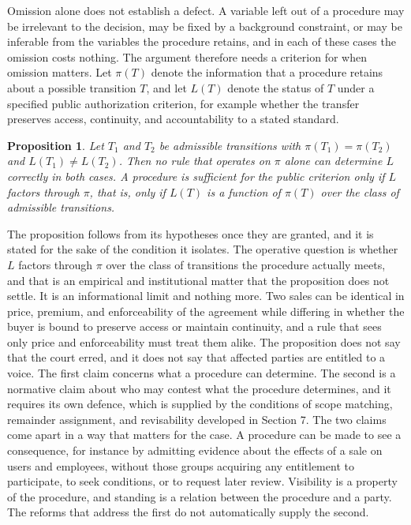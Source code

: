 \documentclass[11pt]{article}
\newtheorem{proposition}{Proposition}
\theoremstyle{definition}
\begin{document}
Omission alone does not establish a defect. A variable left out of a procedure may be irrelevant to the decision, may be fixed by a background constraint, or may be inferable from the variables the procedure retains, and in each of these cases the omission costs nothing. The argument therefore needs a criterion for when omission matters. Let $\pi(T)$ denote the information that a procedure retains about a possible transition $T$, and let $L(T)$ denote the status of $T$ under a specified public authorization criterion, for example whether the transfer preserves access, continuity, and accountability to a stated standard.

\begin{proposition}
Let $T_1$ and $T_2$ be admissible transitions with $\pi(T_1)=\pi(T_2)$ and $L(T_1)\neq L(T_2)$. Then no rule that operates on $\pi$ alone can determine $L$ correctly in both cases. A procedure is sufficient for the public criterion only if $L$ factors through $\pi$, that is, only if $L(T)$ is a function of $\pi(T)$ over the class of admissible transitions.
\end{proposition}

The proposition follows from its hypotheses once they are granted, and it is stated for the sake of the condition it isolates. The operative question is whether $L$ factors through $\pi$ over the class of transitions the procedure actually meets, and that is an empirical and institutional matter that the proposition does not settle. It is an informational limit and nothing more. Two sales can be identical in price, premium, and enforceability of the agreement while differing in whether the buyer is bound to preserve access or maintain continuity, and a rule that sees only price and enforceability must treat them alike. The proposition does not say that the court erred, and it does not say that affected parties are entitled to a voice. The first claim concerns what a procedure can determine. The second is a normative claim about who may contest what the procedure determines, and it requires its own defence, which is supplied by the conditions of scope matching, remainder assignment, and revisability developed in Section 7. The two claims come apart in a way that matters for the case. A procedure can be made to see a consequence, for instance by admitting evidence about the effects of a sale on users and employees, without those groups acquiring any entitlement to participate, to seek conditions, or to request later review. Visibility is a property of the procedure, and standing is a relation between the procedure and a party. The reforms that address the first do not automatically supply the second.
\end{document}

